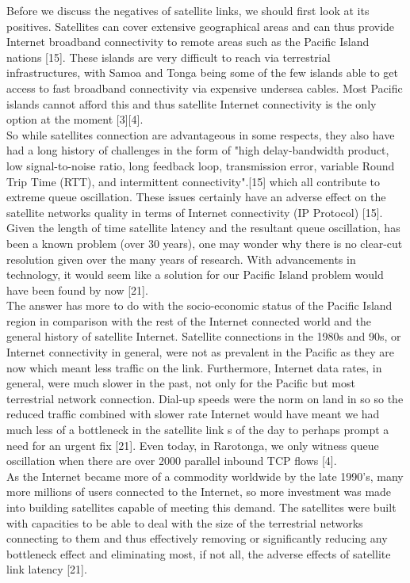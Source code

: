 \documentclass{uathesis}
\begin{document}
Before we discuss the negatives of satellite links, we should first look at its positives. Satellites can cover extensive geographical areas and can thus provide Internet broadband connectivity to remote areas such as the Pacific Island nations [15]. These islands are very difficult to reach via terrestrial infrastructures, with Samoa and Tonga being some of the few islands able to get access to fast broadband connectivity via expensive undersea cables. Most Pacific islands cannot afford this and thus satellite Internet connectivity is the only option at the moment [3][4]. \\

So while satellites connection are advantageous in some respects, they also have had a long history of challenges in the form of "high delay-bandwidth product, low signal-to-noise ratio, long feedback loop, transmission error, variable Round Trip Time (RTT), and intermittent connectivity".[15] which all contribute to extreme queue oscillation. These issues certainly have an adverse effect on the satellite networks quality in terms of Internet connectivity (IP Protocol) [15]. \\

Given the length of time satellite latency and the resultant queue oscillation, has been a known problem (over 30 years), one may wonder why there is no clear-cut resolution given over the many years of research. With advancements in technology, it would seem like a solution for our Pacific Island problem would have been found by now [21]. \\

The answer has more to do with the socio-economic status of the Pacific Island region in comparison with the rest of the Internet connected world and the general history of satellite Internet. Satellite connections in the 1980s and 90s, or Internet connectivity in general, were not as prevalent in the Pacific as they are now which meant less traffic on the link. Furthermore, Internet data rates, in general, were much slower in the past, not only for the Pacific but most terrestrial network connection. Dial-up speeds were the norm on land in so so the reduced traffic combined with slower rate Internet would have meant we had much less of a bottleneck in the satellite link s of the day to perhaps prompt a need for an urgent fix [21]. Even today, in Rarotonga, we only witness queue oscillation when there are over 2000 parallel inbound TCP flows [4]. \\

As the Internet became more of a commodity worldwide by the late 1990's, many more millions of users connected to the Internet, so more investment was made into building satellites capable of meeting this demand. The satellites were built with capacities to be able to deal with the size of the terrestrial networks connecting to them and thus effectively removing or significantly reducing any bottleneck effect and eliminating most, if not all, the adverse effects of satellite link latency [21].\\
\end{document}
